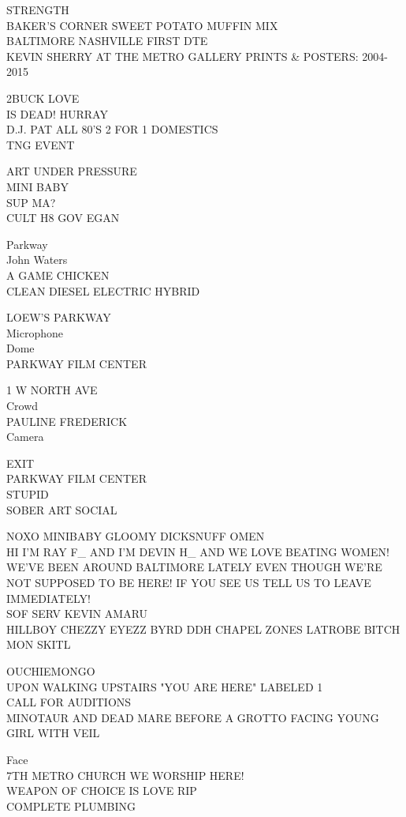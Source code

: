 \documentclass[10pt,letterpaper]{article}
\begin{document}
STRENGTH\\
BAKER'S CORNER SWEET POTATO MUFFIN MIX\\
BALTIMORE NASHVILLE FIRST DTE\\
KEVIN SHERRY AT THE METRO GALLERY PRINTS \& POSTERS: 2004{-}2015

2BUCK LOVE\\
IS DEAD! HURRAY\\
D.J. PAT ALL 80'S 2 FOR 1 DOMESTICS\\
TNG EVENT

ART UNDER PRESSURE\\
MINI BABY\\
SUP MA?\\
CULT H8 GOV EGAN

Parkway\\
John Waters\\
A GAME CHICKEN\\
CLEAN DIESEL ELECTRIC HYBRID

LOEW'S PARKWAY\\
Microphone\\
Dome\\
PARKWAY FILM CENTER

1 W NORTH AVE\\
Crowd\\
PAULINE FREDERICK\\
Camera

EXIT\\
PARKWAY FILM CENTER\\
STUPID\\
SOBER ART SOCIAL

NOXO MINIBABY GLOOMY DICKSNUFF OMEN\\
HI I'M RAY F\_ AND I'M DEVIN H\_ AND WE LOVE BEATING WOMEN!  WE'VE BEEN AROUND BALTIMORE LATELY EVEN THOUGH WE'RE NOT SUPPOSED TO BE HERE!  IF YOU SEE US TELL US TO LEAVE IMMEDIATELY!\\
SOF SERV KEVIN AMARU\\
HILLBOY CHEZZY EYEZZ BYRD DDH CHAPEL ZONES LATROBE BITCH MON SKITL

OUCHIEMONGO\\
UPON WALKING UPSTAIRS "YOU ARE HERE" LABELED 1\\
CALL FOR AUDITIONS\\
MINOTAUR AND DEAD MARE BEFORE A GROTTO FACING YOUNG GIRL WITH VEIL

Face\\
7TH METRO CHURCH WE WORSHIP HERE!\\
WEAPON OF CHOICE IS LOVE RIP\\
COMPLETE PLUMBING
\end{document}
